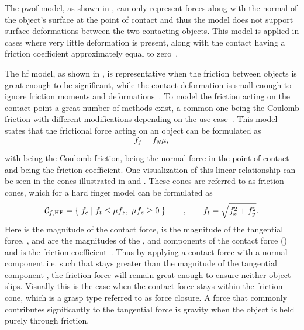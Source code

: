 The \gls{pwof} model, as shown in , can only represent forces along with the normal  of the object's surface at the point of contact  and thus the model does not support surface deformations between the two contacting objects. This model is applied in cases where very little deformation is present, along with the contact having a friction coefficient approximately equal to zero~\cite[Chapter 38]{handbook-of-robotics}.\medskip


The \gls{hf} model, as shown in , is representative when the friction between objects is great enough to be significant, while the contact deformation is small enough to ignore friction moments and deformations~\cite[Chapter 38]{handbook-of-robotics}. To model the friction acting on the contact point a great number of methods exist, a common one being the Coulomb friction with different modifications depending on the use case~\cite{modelling-of-joint-friction-in-robotic-manipulators-with-gear-transmissions}. 
This model states that the frictional force acting on an object can be formulated as
%
\begin{equation}
	f_f = f_N \mu,
	\label{eq:coulomb-friction}
\end{equation}

with  being the Coulomb friction,  being the normal force in the point of contact and \mvar{\mu\in[0,1]} being the friction coefficient. One visualization of this linear relationship can be seen in the cones illustrated in  and . These cones are referred to as friction cones, which for a hard finger model can be formulated as
%
\begin{equation} 
	\mathcal{C}_{f,\text{HF}} = \left\{ \; f_c\; \middle|\; f_{t} \le \mu f_z,\; \mu f_z \ge 0 \; \right\} \qquad , \qquad f_t = \sqrt{f_x^2 + f_y^2}.
	\label{eq:hf}
\end{equation}
Here  is the magnitude of the contact force,  is the magnitude of the tangential force, ,  and  are the magnitudes of the ,  and  components of the contact force () and \mvar{\mu} is the friction coefficient~\cite[Chapter 37]{handbook-of-robotics}. 
Thus by applying a contact force with a normal component i.e.  such that  stays greater than the magnitude of the tangential component , the friction force will remain great enough to ensure neither object slips. Visually this is the case when the contact force  stays within the friction cone, which is a grasp type referred to as force closure. A force that commonly contributes significantly to the tangential force is gravity when the object is held purely through friction. \medskip


